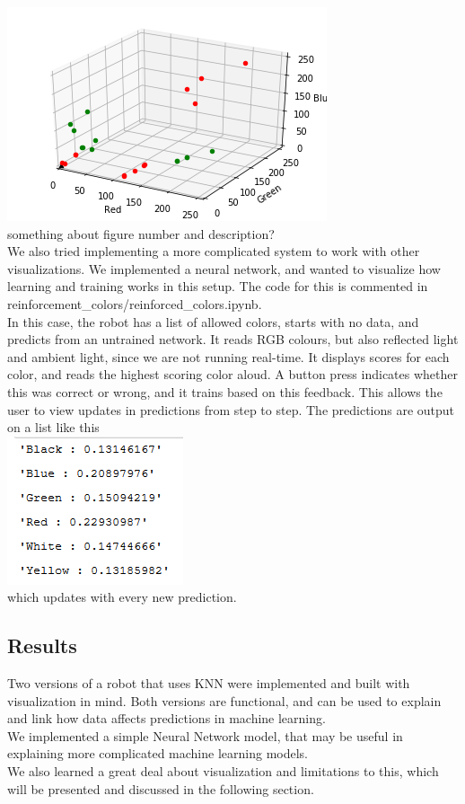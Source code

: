 \documentclass[11pt, a4paper]{article}
\begin{document}
\includegraphics[scale=1]{images/ColourKNNversion2.png} \\
something about figure number and description? \\
We also tried implementing a more complicated system to work with other visualizations. We implemented a neural network, and wanted to visualize how learning and training works in this setup. The code for this is commented in reinforcement\_colors/reinforced\_colors.ipynb. \\
In this case, the robot has a list of allowed colors, starts with no data, and predicts from an untrained network. It reads RGB colours, but also reflected light and ambient light, since we are not running real-time. It displays scores for each color, and reads the highest scoring color aloud. A button press indicates whether this was correct or wrong, and it trains based on this feedback. This allows the user to view updates in predictions from step to step. The predictions are output on a list like this \\
\includegraphics[scale=1]{images/NNcolours.png} \\
which updates with every new prediction.
\subsection{Results}
Two versions of a robot that uses KNN were implemented and built with visualization in mind. Both versions are functional, and can be used to explain and link how data affects predictions in machine learning.  \\
We implemented a simple Neural Network model, that may be useful in explaining more complicated machine learning models. \\
We also learned a great deal about visualization and limitations to this, which will be presented and discussed in the following section.
\end{document}

